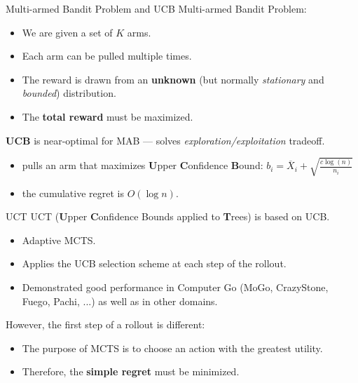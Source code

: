 \documentclass{beamer}
\begin{document}
\begin{frame}{Multi-armed Bandit Problem and UCB}
Multi-armed Bandit Problem:
\begin{itemize}
\item We are given a set of $K$ arms.
\item Each arm can be pulled multiple times.
\item The reward is drawn from an {\bf unknown} (but normally {\it
    stationary} and {\it bounded}) distribution.
\item The {\bf total reward} must be maximized.
\end{itemize}

{\bf UCB} is near-optimal for MAB --- solves
{\it exploration/exploitation} tradeoff.
\begin{itemize}
\item pulls an arm that maximizes {\bf U}pper {\bf C}onfidence {\bf
    B}ound: $b_i=\overline X_i+\sqrt {\frac {c \log (n)} {n_i}}$
\item the cumulative regret is $O(\log n)$.
\end{itemize}
\end{frame}

\begin{frame}{UCT}
UCT ({\bf U}pper {\bf C}onfidence Bounds applied to {\bf T}rees) is 
based on UCB.
\begin{itemize}
\item Adaptive MCTS.
\item Applies the UCB selection scheme at each step of the rollout.
\item Demonstrated good performance in Computer Go (MoGo, CrazyStone, Fuego,
  Pachi, ...) as well as in other domains.
\end{itemize}
However, the first step of a rollout is different:
\begin{itemize}
\item The purpose of MCTS is to choose an action with the greatest utility.
\item Therefore, the {\bf simple regret} must be minimized.
\end{itemize}
\end{frame}
\end{document}
